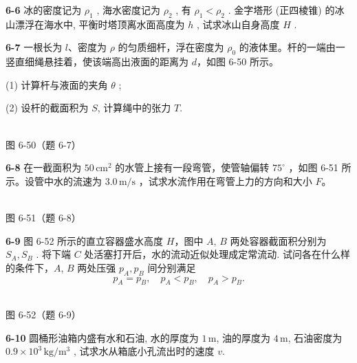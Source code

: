 \textbf{6-6} 冰的密度记为 $\rho_{1}$ , 海水密度记为 $\rho_{2}$ , 有 $\rho_{1} < \rho_{2}$ . 金字塔形 (正四棱锥) 的冰山漂浮在海水中, 平衡时塔顶离水面高度为 $h$ , 试求冰山自身高度 $H$ .

\newpage

\textbf{6-7} 一根长为 $l$、密度为 $\rho$ 的匀质细杆，浮在密度为 $\rho_{0}$ 的液体里。杆的一端由一竖直细绳悬挂着，使该端高出液面的距离为 $d$，如图 6-50 所示。

(1) 计算杆与液面的夹角 $\theta$ ;

(2) 设杆的截面积为 $S$, 计算绳中的张力 $T$.

\begin{center}
\resizebox{0.50\textwidth}{!}{}\\[4pt]
{\small 图 6-50（题 6-7）}
\end{center}

\newpage

\textbf{6-8} 在一截面积为 $50\,\mathrm{cm}^{2}$ 的水管上接有一段弯管，使管轴偏转 $75^{\circ}$ ，如图 6-51 所示。设管中水的流速为 $3.0\,\mathrm{m/s}$ ，试求水流作用在弯管上力的方向和大小 $F$。

\begin{center}
\resizebox{0.50\textwidth}{!}{}\\[4pt]
{\small 图 6-51（题 6-8）}
\end{center}

\newpage

\textbf{6-9} 图 6-52 所示的直立容器盛水高度 $H$，图中 $A$, $B$ 两处容器截面积分别为 $S_{A}, S_{B}$ . 将下端 $C$ 处活塞打开后，水的流动近似处理成定常流动. 试问各在什么样的条件下，$A$, $B$ 两处压强 $p_{A}, p_{B}$ 间分别满足
\[
p _ {A} = p _ {B}, \quad p _ {A} <   p _ {B}, \quad p _ {A} > p _ {B}.
\]

\begin{center}
\resizebox{0.42\textwidth}{!}{}\\[4pt]
{\small 图 6-52（题 6-9）}
\end{center}

\newpage

\textbf{6-10} 圆桶形油箱内盛有水和石油, 水的厚度为 $1\,\mathrm m$, 油的厚度为 $4\,\mathrm m$, 石油密度为 $0.9 \times 10^{3}\,\mathrm{kg/m^{3}}$ , 试求水从箱底小孔流出时的速度 $v$.

